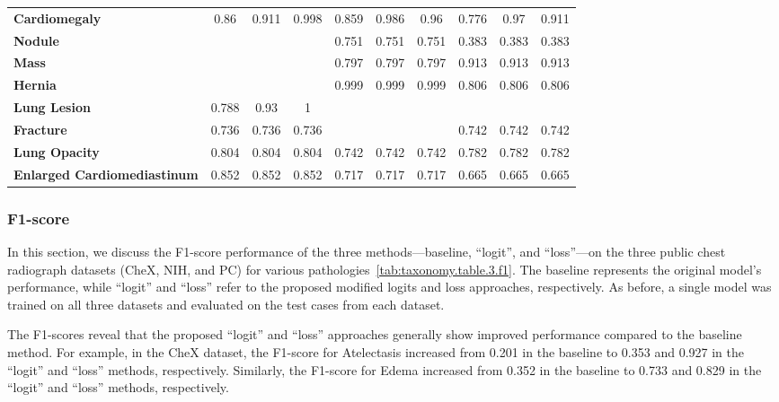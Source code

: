 \begin{table}[]
{\begin{tabular}{lccccccccc}
\textbf{Cardiomegaly}                 & 0.86      & 0.911     & 0.998     & 0.859     & 0.986     & 0.96     & 0.776     & 0.97     & 0.911    \\
\textbf{Nodule}                       &           &           &           & 0.751     & 0.751     & 0.751    & 0.383     & 0.383    & 0.383    \\
\textbf{Mass}                         &           &           &           & 0.797     & 0.797     & 0.797    & 0.913     & 0.913    & 0.913    \\
\textbf{Hernia}                       &           &           &           & 0.999     & 0.999     & 0.999    & 0.806     & 0.806    & 0.806    \\
\textbf{Lung Lesion}                  & 0.788     & 0.93      & 1         &           &           &          &           &          &          \\
\textbf{Fracture}                     & 0.736     & 0.736     & 0.736     &           &           &          & 0.742     & 0.742    & 0.742    \\
\textbf{Lung Opacity}                 & 0.804     & 0.804     & 0.804     & 0.742     & 0.742     & 0.742    & 0.782     & 0.782    & 0.782    \\
\textbf{Enlarged   Cardiomediastinum} & 0.852     & 0.852     & 0.852     & 0.717     & 0.717     & 0.717    & 0.665     & 0.665    & 0.665
\end{tabular}%
}\label{tab:taxonomy.table.2.auc_default}
\end{table}

\subsubsection*{F1-score}
In this section, we discuss the F1-score performance of the three methods---baseline, ``logit'', and ``loss''---on the three public chest radiograph datasets (CheX, NIH, and PC) for various pathologies~\ref{tab:taxonomy.table.3.f1}. The baseline represents the original model's performance, while ``logit'' and ``loss'' refer to the proposed modified logits and loss approaches, respectively. As before, a single model was trained on all three datasets and evaluated on the test cases from each dataset.

The F1-scores reveal that the proposed ``logit'' and ``loss'' approaches generally show improved performance compared to the baseline method. For example, in the CheX dataset, the F1-score for Atelectasis increased from 0.201 in the baseline to 0.353 and 0.927 in the ``logit'' and ``loss'' methods, respectively. Similarly, the F1-score for Edema increased from 0.352 in the baseline to 0.733 and 0.829 in the ``logit'' and ``loss'' methods, respectively.

